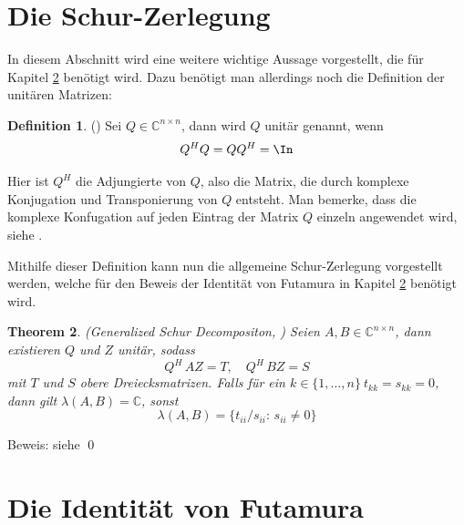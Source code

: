 \documentclass[a4paper,12pt]{report}
\newcommand{\C}{\mathbb C}
\newcommand{\1}{\mathds{1}}
\theoremstyle{plain} %
\newtheorem{theorem}{Theorem}
\theoremstyle{definition} %
\newtheorem{definition}[theorem]{Definition}
\theoremstyle{remark}
\begin{document}
      \section{Die Schur-Zerlegung}
            In diesem Abschnitt wird eine weitere wichtige Aussage vorgestellt, die für Kapitel \ref{sec: Futamura} benötigt wird.
            Dazu benötigt man allerdings noch die Definition der unitären Matrizen:
            \begin{definition}(\cite[S. 73]{matrixGolub})
                  Sei $Q \in\C^{n\times n}$, dann wird $Q$ unitär genannt, wenn
                  $$Q^HQ = QQ^H=\In$$
            \end{definition}

            Hier ist $Q^H$ die Adjungierte von $Q$, also die Matrix, die durch komplexe Konjugation und Transponierung von $Q$ entsteht.
            Man bemerke, dass die komplexe Konfugation auf jeden Eintrag der Matrix $Q$ einzeln angewendet wird, siehe \cite[S. 14]{matrixGolub}.

            Mithilfe dieser Definition kann nun die allgemeine Schur-Zerlegung vorgestellt werden, welche für den Beweis der Identität von Futamura
            in Kapitel \ref{sec: Futamura} benötigt wird.
            \begin{theorem}(Generalized Schur Decompositon, \cite[S. 377]{matrixGolub})
                  \label{thrm: allg Schur Zerlegung}
                  Seien $A, B \in \C^{n\times n}$, dann existieren $Q$ und $Z$ unitär, sodass
                  \begin{equation}
                        \label{eqn: allg Schur_Resultat}
                        Q^H\,AZ = T,\quad Q^H\, BZ = S
                  \end{equation}
                  mit $T$ und $S$ obere Dreiecksmatrizen.
                  Falls für ein $k\in \{1,\dots, n\}\ t_{kk}=s_{kk}=0$, dann gilt $\lambda(A, B) = \C$, sonst
                  \begin{equation}
                        \label{eqn: EW Pencil nach Schur}
                        \lambda(A, B) = \{t_{ii}/s_{ii}:\, s_{ii}\ne 0\}
                  \end{equation}
            \end{theorem}
            Beweis: siehe \cite[S. 377]{matrixGolub}\qed
      
      \section{Die Identität von Futamura}
      \label{sec: Futamura}
\end{document}
